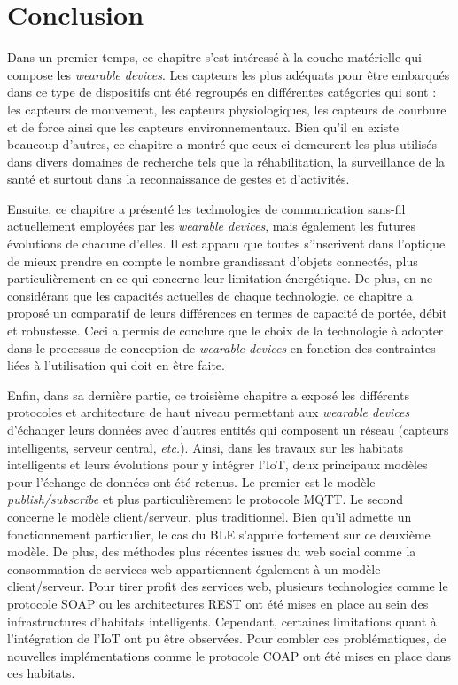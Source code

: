 \section{Conclusion}

Dans un premier temps, ce chapitre s'est intéressé à la couche matérielle qui compose les \textit{wearable devices}. Les capteurs les plus adéquats pour être embarqués dans ce type de dispositifs ont été regroupés en différentes catégories qui sont : les capteurs de mouvement, les capteurs physiologiques, les capteurs de courbure et de force ainsi que les capteurs environnementaux. Bien qu'il en existe beaucoup d'autres, ce chapitre a montré que ceux-ci demeurent les plus utilisés dans divers domaines de recherche tels que la réhabilitation, la surveillance de la santé et surtout dans la reconnaissance de gestes et d'activités.

Ensuite, ce chapitre a présenté les technologies de communication sans-fil actuellement employées par les \textit{wearable devices}, mais également les futures évolutions de chacune d'elles. Il est apparu que toutes s'inscrivent dans l'optique de mieux prendre en compte le nombre grandissant d'objets connectés, plus particulièrement en ce qui concerne leur limitation énergétique. De plus, en ne considérant que les capacités actuelles de chaque technologie, ce chapitre a proposé un comparatif de leurs différences en termes de capacité de portée, débit et robustesse. Ceci a permis de conclure que le choix de la technologie à adopter dans le processus de conception de \textit{wearable devices} en fonction des contraintes liées à l’utilisation qui doit en être faite.

Enfin, dans sa dernière partie, ce troisième chapitre a exposé les différents protocoles et architecture de haut niveau permettant aux \textit{wearable devices} d'échanger leurs données avec d'autres entités qui composent un réseau (capteurs intelligents, serveur central, \textit{etc.}). Ainsi, dans les travaux sur les habitats intelligents et leurs évolutions pour y intégrer l'\acs{IoT}, deux principaux modèles pour l'échange de données ont été retenus. Le premier est le modèle \textit{publish/subscribe} et plus particulièrement le protocole \acs{MQTT}. Le second concerne le modèle client/serveur, plus traditionnel. Bien qu'il admette un fonctionnement particulier, le cas du \acs{BLE} s'appuie fortement sur ce deuxième modèle. De plus, des méthodes plus récentes issues du web social comme la consommation de services web appartiennent également à un modèle client/serveur. Pour tirer profit des services web, plusieurs technologies comme le protocole \acs{SOAP} ou les architectures \acs{REST} ont été mises en place au sein des infrastructures d'habitats intelligents. Cependant, certaines limitations quant à l'intégration de l'\acs{IoT} ont pu être observées. Pour combler ces problématiques, de nouvelles implémentations comme le protocole \acs{COAP} ont été mises en place dans ces habitats.